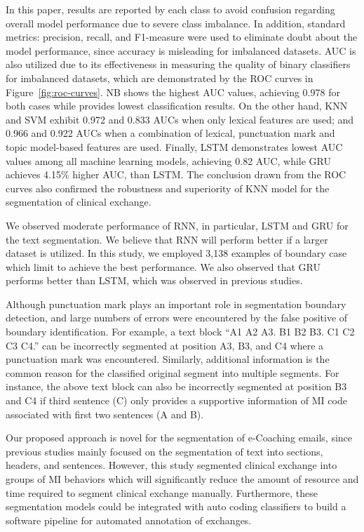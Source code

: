 \documentclass{amia}
\begin{document}
In this paper, results are reported by each class to avoid confusion regarding overall model performance due to severe class imbalance. In addition, standard metrics: precision, recall, and F1-measure were used to eliminate doubt about the model performance, since accuracy is misleading for imbalanced datasets. AUC is also utilized due to its effectiveness in measuring the quality of binary classifiers for imbalanced datasets\cite{hu2015kernelized}, which are demonstrated by the ROC curves in Figure~\ref{fig:roc-curves}. NB shows the highest AUC values, achieving 0.978 for both cases while provides lowest classification results. On the other hand, KNN and SVM exhibit 0.972 and 0.833 AUCs when only lexical features are used; and 0.966 and 0.922 AUCs when a combination of lexical, punctuation mark and topic model-based features are used. Finally, LSTM demonstrates lowest AUC values among all machine learning models, achieving 0.82 AUC, while GRU achieves 4.15\% higher AUC, than LSTM. The conclusion drawn from the ROC curves also confirmed the robustness and superiority of KNN model for the segmentation of clinical exchange.      

We observed moderate performance of RNN, in particular, LSTM and GRU for the text segmentation. We believe that RNN will perform better if a larger dataset is utilized. In this study, we employed 3,138 examples of boundary case which limit to achieve the best performance. We also observed that GRU performs better than LSTM, which was observed in previous studies\cite{chung2014empirical}.

Although punctuation mark plays an important role in segmentation boundary detection, and large numbers of errors were encountered by the false positive of boundary identification. For example, a text block ``A1 A2 A3. B1 B2 B3. C1 C2 C3 C4.'' can be incorrectly segmented at position A3, B3, and C4 where a punctuation mark was encountered. Similarly, additional information is the common reason for the classified original segment into multiple segments. For instance, the above text block can also be incorrectly segmented at position B3 and C4 if third sentence (C) only provides a supportive information of MI code associated with first two sentences (A and B). 

Our proposed approach is novel for the segmentation of e-Coaching emails, since previous studies mainly focused on the segmentation of text into sections, headers, and sentences. However, this study segmented clinical exchange into groups of MI behaviors which will significantly reduce the amount of resource and time required to segment clinical exchange manually. Furthermore, these segmentation models could be integrated with auto coding classifiers to build a software pipeline for automated annotation of exchanges.
\end{document}
